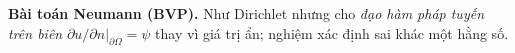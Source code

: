\textbf{Bài toán Neumann (BVP).}
Như Dirichlet nhưng cho \emph{đạo hàm pháp tuyến trên biên} $\partial u/\partial n|_{\partial\Omega}=\psi$ thay vì giá trị ẩn; nghiệm xác định sai khác một hằng số.
